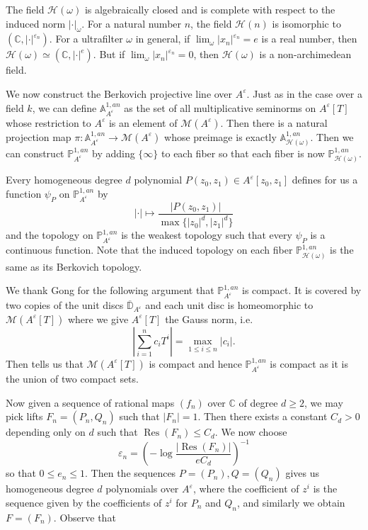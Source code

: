 \documentclass[10pt]{amsart}
\newcommand{\bb}{\mathbb}
\newcommand{\Res}{\operatorname{Res}}
\newcommand{\ovl}{\overline}
\newcommand{\berkP}{\mathbb{P}^{1,an}}
\newcommand{\berkA}{\mathbb{A}^{1,an}}
\newcommand{\cal}{\mathcal}
\newcommand{\eps}{\varepsilon}
\numberwithin{theorem}{section}
\numberwithin{example}{section}
\numberwithin{definition}{section}
\begin{document}
The field $\cal{H}(\omega)$ is algebraically closed and is complete with respect to the induced norm $| \cdot |_{\omega}$. For a natural number $n$, the field $\cal{H}(n)$ is isomorphic to $(\bb{C}, | \cdot |^{\eps_n})$. For a ultrafilter $\omega$ in general, if $\lim_{\omega} |x_n|^{\eps_n} = e$ is a real number, then $\cal{H}(\omega) \simeq (\bb{C}, | \cdot |^e)$. But if $\lim_{\omega} |x_n|^{\eps_n} = 0$, then $\cal{H}(\omega)$ is a non-archimedean field. 
\par 
We now construct the Berkovich projective line over $A^{\eps}$. Just as in the case over a field $k$, we can define $\berkA_{A^{\eps}}$ as the set of all multiplicative seminorms on $A^{\eps}[T]$ whose restriction to $A^{\eps}$ is an element of $\cal{M}(A^{\eps})$. Then there is a natural projection map $\pi: \berkA_{A^{\eps}} \to \cal{M}(A^{\eps})$ whose preimage is exactly $\berkA_{\cal{H}(\omega)}$. Then we can construct $\berkP_{A^{\eps}}$ by adding $\{\infty\}$ to each fiber so that each fiber is now $\berkP_{\cal{H}(\omega)}$. 
\par 
Every homogeneous degree $d$ polynomial $P(z_0,z_1) \in A^{\eps}[z_0,z_1]$ defines for us a function $\psi_P$ on $\berkP_{A^{\eps}}$ by 
$$| \cdot |\mapsto \frac{|P(z_0,z_1)|}{\max\{|z_0|^d, |z_1|^d\}}$$
and the topology on $\berkP_{A^{\eps}}$ is the weakest topology such that every $\psi_P$ is a continuous function. Note that the induced topology on each fiber $\berkP_{\cal{H}(\omega)}$ is the same as its Berkovich topology. 
\par 
We thank Gong for the following argument that $\berkP_{A^{\eps}}$ is compact. It is covered by two copies of the unit discs $\ovl{\bb{D}}_{A^{\eps}}$ and each unit disc is homeomorphic to $\cal{M}(A^{\eps}[T])$ where we give $A^{\eps}[T]$ the Gauss norm, i.e. 
$$|\sum_{i=1}^{n} c_i T^i| = \max_{1 \leq i \leq n} |c_i|.$$
Then \cite[Theorem 1.2.1]{Ber90} tells us that $\cal{M}(A^{\eps}[T])$ is compact and hence $\berkP_{A^{\eps}}$ is compact as it is the union of two compact sets. 
\par 
Now given a sequence of rational maps $(f_n)$ over $\bb{C}$ of degree $d \geq 2$, we may pick lifts $F_n = (P_n,Q_n)$ such that $|F_n| = 1$. Then there exists a constant $C_d> 0$ depending only on $d$ such that $\Res(F_n) \leq C_d$. We now choose 
$$\eps_n = \left(-\log \frac{|\Res(F_n)|}{eC_d} \right)^{-1}$$ 
so that $0 \leq e_n \leq 1$. Then the sequences $P = (P_n),Q = (Q_n)$ gives us homogeneous degree $d$ polynomials over $A^{\eps}$, where the coefficient of $z^i$ is the sequence given by the coefficients of $z^i$ for $P_n$ and $Q_n$, and similarly we obtain $F = (F_n)$. Observe that 
\end{document}
